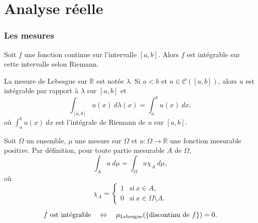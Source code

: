 \part{Analyse réelle}

\section{Les mesures}

\begin{theo}
    Soit $f$ une fonction continue sur l'intervalle $[a,b]$. Alors $f$ est intégrable sur cette intervalle selon Riemann.
\end{theo}

\begin{definition}
    La mesure de Lebesgue sur $\mathbb{R}$ est notée $\lambda$. Si $a<b$ et $u\in\mathcal{C}([a,b])$, alors $u$ est intégrable par rapport à $\lambda$ sur $[a,b]$ et
    \begin{equation}
        \int_{[a,b]}u(x)\ d\lambda(x) = \int_a^b u(x)\ dx,
    \end{equation}
    où $\int_a^b u(x)\ dx$ est l'intégrale de Riemann de $u$ sur $[a,b]$.
\end{definition}

\begin{definition}
    Soit $\Omega$ un ensemble, $\mu$ une mesure sur $\Omega$ et $u:\Omega\rightarrow\mathbb{R}$ une fonction mesurable positive. Par définition, pour toute partie mesurable $A$ de $\Omega$,
    \begin{equation*}
        \int_A u\ d\mu = \int_\Omega u\chi_A\ d\mu,
    \end{equation*}
    où
    \begin{equation}
        \chi_A = \left\{\begin{array}{ll}
            1 & \mathrm{si}\ x\in A, \\
            0 & \mathrm{si}\ x\in\Omega\setminus A.
        \end{array}\right.
    \end{equation}
\end{definition}

\begin{theo}[Lebesgue]
    \begin{equation}
        f\ \mathrm{est\ int\Acute{e}grable} \quad\Leftrightarrow\quad \mu_{\mathrm{Lebesgue}}(\{\mathrm{discontinu\ de}\ f\}) = 0.
    \end{equation}
\end{theo}

